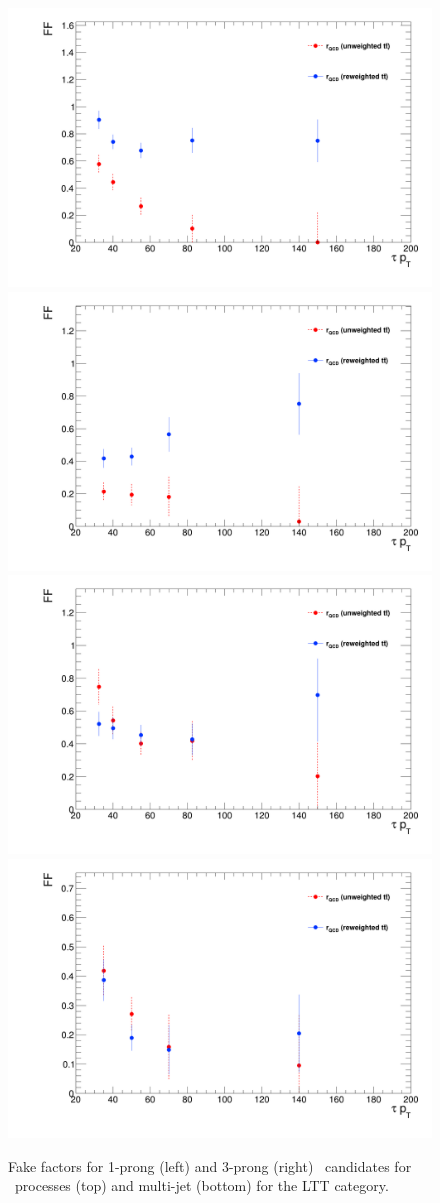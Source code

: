 \begin{figure}[htbp]
\centering
\includegraphics[width=.4\textwidth]{DiHiggs/plots/FF_CRs/LTTttbarCR1p.png}
\includegraphics[width=.4\textwidth]{DiHiggs/plots/FF_CRs/LTTttbarCR3p.png} \\
\includegraphics[width=.4\textwidth]{DiHiggs/plots/FF_CRs/LTTInvCR1p.png}
\includegraphics[width=.4\textwidth]{DiHiggs/plots/FF_CRs/LTTInvCR3p.png}\\
\caption{Fake factors for 1-prong (left) and 3-prong (right) \tauhad\ candidates for \ttbar\ processes (top) and multi-jet (bottom) for the \lephad LTT category.}
\label{fig:LTT_FF}
\end{figure}


